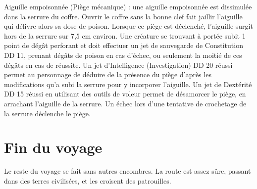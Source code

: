 \documentclass[a4paper,10pt,openany]{book}
\begin{document}
\begin{multicols}{2}
\begin{quotebox}
	Aiguille empoisonnée (Piège mécanique) : une aiguille empoisonnée est dissimulée dans la serrure du coffre. Ouvrir le coffre sans la bonne clef fait
	jaillir l’aiguille qui délivre alors sa dose de poison. Lorsque ce piège est déclenché, l’aiguille surgit hors de la serrure sur 7,5 cm environ. Une
	créature se trouvant à portée subit 1 point de dégât perforant et doit effectuer un jet de sauvegarde de Constitution DD 11, prenant 
	dégâts de poison en cas d’échec, ou seulement la moitié de ces dégâts en cas de réussite. Un jet d’Intelligence (Investigation) DD 20 réussi permet
	au personnage de déduire de la présence du piège d’après les modifications qu’a subi la serrure pour y incorporer l’aiguille. Un jet de Dextérité DD
	15 réussi en utilisant des outils de voleur permet de désamorcer le piège, en arrachant l’aiguille de la serrure. Un échec lors d’une tentative de
	crochetage de la serrure déclenche le piège.
\end{quotebox}

\section{Fin du voyage}
Le reste du voyage se fait sans autres encombres. La route est assez sûre, passant dans des terres civilisées, et les \PJs croisent des patrouilles.


\end{multicols}
\end{document}
